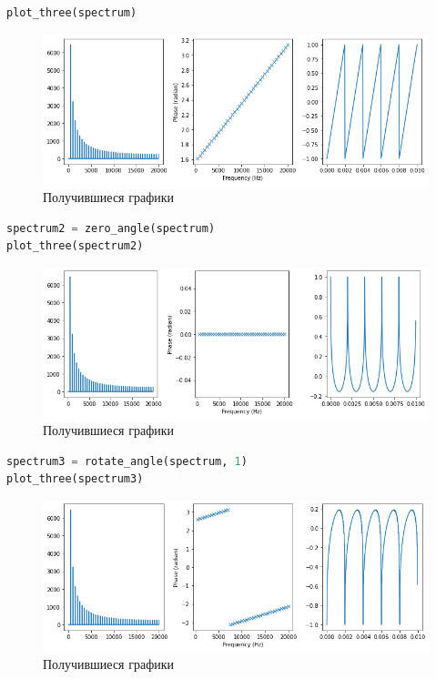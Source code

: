 \begin{lstlisting}[language=Python]
plot_three(spectrum)
\end{lstlisting}
\begin{figure}[H]
	\begin{center}
		\includegraphics[scale=0.66]{fig/lab06/lab06_47_1.png}
		\caption{Получившиеся графики}
	\end{center}
\end{figure}

\begin{lstlisting}[language=Python]
spectrum2 = zero_angle(spectrum)
plot_three(spectrum2)
\end{lstlisting}
\begin{figure}[H]
	\begin{center}
		\includegraphics[scale=0.66]{fig/lab06/lab06_49_1.png}
		\caption{Получившиеся графики}
	\end{center}
\end{figure}


\begin{lstlisting}[language=Python]
spectrum3 = rotate_angle(spectrum, 1)
plot_three(spectrum3)
\end{lstlisting}
\begin{figure}[H]
	\begin{center}
		\includegraphics[scale=0.66]{fig/lab06/lab06_51_1.png}
		\caption{Получившиеся графики}
	\end{center}
\end{figure}


